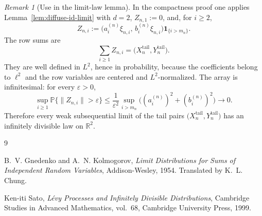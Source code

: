 \documentclass[11pt]{amsart}
\theoremstyle{remark}
\newtheorem{remark}[lemma]{Remark}
\newcommand{\Prob}{\mathbb P}
\newcommand{\R}{\mathbb R}
\newcommand{\eps}{\varepsilon}
\newcommand{\norm}[1]{\lVert #1 \rVert}
\begin{document}
\begin{remark}[Use in the limit-law lemma]
In the compactness proof one applies Lemma~\ref{lem:diffuse-id-limit} with
$d=2$, $Z_{n,1}:=0$, and, for $i\ge2$,
\[
Z_{n,i}
:=
\bigl(a_i^{(n)}\xi_{n,i},\,b_i^{(n)}\xi_{n,i}\bigr)
\mathbf 1_{\{i>m_n\}}.
\]
The row sums are
\[
\sum_{i\ge1}Z_{n,i}
=
\bigl(X_n^{\mathrm{tail}},Y_n^{\mathrm{tail}}\bigr).
\]
They are well defined in $L^2$, hence in probability, because the coefficients
belong to $\ell^2$ and the row variables are centered and $L^2$-normalized.
The array is infinitesimal: for every $\eps>0$,
\[
\sup_{i\ge1}
\Prob\{\norm{Z_{n,i}}>\eps\}
\le
\frac1{\eps^2}
\sup_{i>m_n}\bigl((a_i^{(n)})^2+(b_i^{(n)})^2\bigr)
\longrightarrow0.
\]
Therefore every weak subsequential limit of the tail pairs
$\bigl(X_n^{\mathrm{tail}},Y_n^{\mathrm{tail}}\bigr)$ has an infinitely
divisible law on $\R^2$.
\end{remark}

%

\begin{thebibliography}{9}

B.~V. Gnedenko and A.~N. Kolmogorov,
\emph{Limit Distributions for Sums of Independent Random Variables},
Addison-Wesley, 1954. Translated by K.~L. Chung.

Ken-iti Sato,
\emph{L\'evy Processes and Infinitely Divisible Distributions},
Cambridge Studies in Advanced Mathematics, vol.~68,
Cambridge University Press, 1999.

\end{thebibliography}
\end{document}
